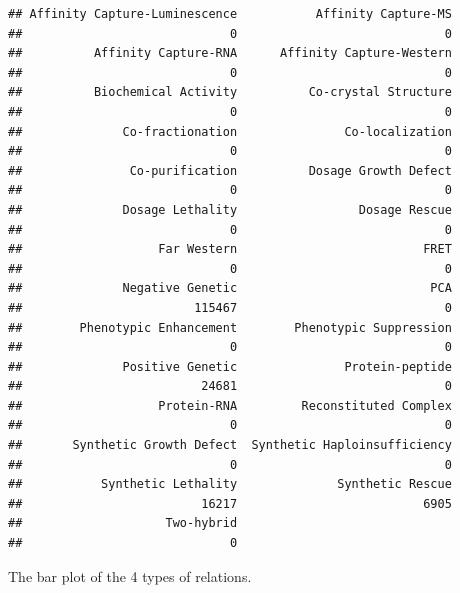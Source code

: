 \documentclass[12pt,]{article}
\begin{document}
\begin{verbatim}
## Affinity Capture-Luminescence           Affinity Capture-MS 
##                             0                             0 
##          Affinity Capture-RNA      Affinity Capture-Western 
##                             0                             0 
##          Biochemical Activity          Co-crystal Structure 
##                             0                             0 
##              Co-fractionation               Co-localization 
##                             0                             0 
##               Co-purification          Dosage Growth Defect 
##                             0                             0 
##              Dosage Lethality                 Dosage Rescue 
##                             0                             0 
##                   Far Western                          FRET 
##                             0                             0 
##              Negative Genetic                           PCA 
##                        115467                             0 
##        Phenotypic Enhancement        Phenotypic Suppression 
##                             0                             0 
##              Positive Genetic               Protein-peptide 
##                         24681                             0 
##                   Protein-RNA         Reconstituted Complex 
##                             0                             0 
##       Synthetic Growth Defect  Synthetic Haploinsufficiency 
##                             0                             0 
##           Synthetic Lethality              Synthetic Rescue 
##                         16217                          6905 
##                    Two-hybrid 
##                             0
\end{verbatim}

The bar plot of the 4 types of relations.
\end{document}
